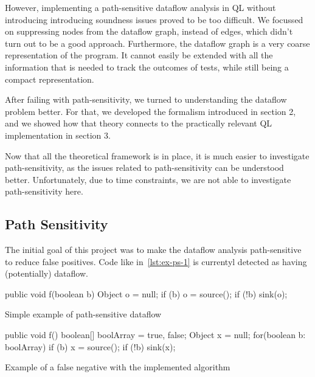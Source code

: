 However, implementing a path-sensitive dataflow analysis in QL without introducing
introducing soundness issues proved to be too difficult.
We focussed on suppressing nodes from the dataflow graph, instead of edges,
which didn't turn out to be a good approach.
Furthermore, the dataflow graph is a very coarse representation of the program.
It cannot easily be extended with all the information that is needed to track the outcomes
of tests, while still being a compact representation.

After failing with path-sensitivity, we turned to understanding the dataflow problem better.
For that, we developed the formalism introduced in section 2, and we showed how that
theory connects to the practically relevant QL implementation in section 3.

Now that all the theoretical framework is in place, 
it is much easier to investigate path-sensitivity, as the issues related to path-sensitivity
can be understood better.
Unfortunately, due to time constraints, we are not able to investigate path-sensitivity here.


\iffalse
\subsection{Path Sensitivity}
The initial goal of this project was to make the dataflow analysis path-sensitive
to reduce false positives. Code like in~\autoref{lst:ex-ps-1} is currentyl detected 
as having (potentially) dataflow.

\begin{listing}[h]
    \begin{javacode}
public void f(boolean b) {
    Object o = null;
    if (b) {
        o = source();
    }
    if (!b) {
        sink(o);
    }
}
    \end{javacode}
    \caption{Simple example of path-sensitive dataflow}
    \label{lst:ex-ps-1}
\end{listing}

\begin{listing}[h]
    \begin{javacode}
public void f() {
    boolean[] boolArray = {true, false};
    Object x = null;
    for(boolean b: boolArray) {
        if (b) {
            x = source();
        }
        if (!b) {
            sink(x);
        }
    }
}
    \end{javacode}
    \caption{Example of a false negative with the implemented algorithm}
    \label{lst:ps-false-negative}
\end{listing}

